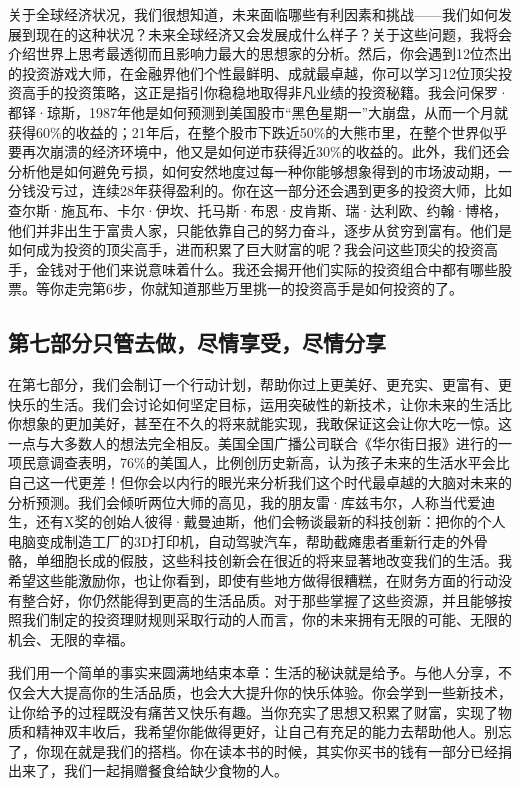关于全球经济状况，我们很想知道，未来面临哪些有利因素和挑战——我们如何发展到现在的这种状况？未来全球经济又会发展成什么样子？关于这些问题，我将会介绍世界上思考最透彻而且影响力最大的思想家的分析。然后，你会遇到12位杰出的投资游戏大师，在金融界他们个性最鲜明、成就最卓越，你可以学习12位顶尖投资高手的投资策略，这正是指引你稳稳地取得非凡业绩的投资秘籍。我会问保罗·都铎·琼斯，1987年他是如何预测到美国股市“黑色星期一”大崩盘，从而一个月就获得60\%的收益的；21年后，在整个股市下跌近50\%的大熊市里，在整个世界似乎要再次崩溃的经济环境中，他又是如何逆市获得近30\%的收益的。此外，我们还会分析他是如何避免亏损，如何安然地度过每一种你能够想象得到的市场波动期，一分钱没亏过，连续28年获得盈利的。你在这一部分还会遇到更多的投资大师，比如查尔斯·施瓦布、卡尔·伊坎、托马斯·布恩·皮肯斯、瑞·达利欧、约翰·博格，他们并非出生于富贵人家，只能依靠自己的努力奋斗，逐步从贫穷到富有。他们是如何成为投资的顶尖高手，进而积累了巨大财富的呢？我会问这些顶尖的投资高手，金钱对于他们来说意味着什么。我还会揭开他们实际的投资组合中都有哪些股票。等你走完第6步，你就知道那些万里挑一的投资高手是如何投资的了。

\subsection{第七部分\q 只管去做，尽情享受，尽情分享}

在第七部分，我们会制订一个行动计划，帮助你过上更美好、更充实、更富有、更快乐的生活。我们会讨论如何坚定目标，运用突破性的新技术，让你未来的生活比你想象的更加美好，甚至在不久的将来就能实现，我敢保证这会让你大吃一惊。这一点与大多数人的想法完全相反。美国全国广播公司联合《华尔街日报》进行的一项民意调查表明，76\%的美国人，比例创历史新高，认为孩子未来的生活水平会比自己这一代更差！但你会以内行的眼光来分析我们这个时代最卓越的大脑对未来的分析预测。我们会倾听两位大师的高见，我的朋友雷·库兹韦尔，人称当代爱迪生，还有X奖的创始人彼得·戴曼迪斯，他们会畅谈最新的科技创新：把你的个人电脑变成制造工厂的3D打印机，自动驾驶汽车，帮助截瘫患者重新行走的外骨骼，单细胞长成的假肢，这些科技创新会在很近的将来显著地改变我们的生活。我希望这些能激励你，也让你看到，即使有些地方做得很糟糕，在财务方面的行动没有整合好，你仍然能得到更高的生活品质。对于那些掌握了这些资源，并且能够按照我们制定的投资理财规则采取行动的人而言，你的未来拥有无限的可能、无限的机会、无限的幸福。

我们用一个简单的事实来圆满地结束本章：生活的秘诀就是给予。与他人分享，不仅会大大提高你的生活品质，也会大大提升你的快乐体验。你会学到一些新技术，让你给予的过程既没有痛苦又快乐有趣。当你充实了思想又积累了财富，实现了物质和精神双丰收后，我希望你能做得更好，让自己有充足的能力去帮助他人。别忘了，你现在就是我们的搭档。你在读本书的时候，其实你买书的钱有一部分已经捐出来了，我们一起捐赠餐食给缺少食物的人。

